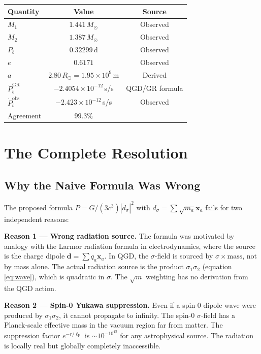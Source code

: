 \documentclass[12pt,a4paper]{article}
\newcommand{\lP}{\ell_{\mathrm{P}}}
\newcommand{\Msun}{M_{\odot}}
\begin{document}
\begin{center}
\renewcommand{\arraystretch}{1.15}
\begin{tabular}{lcc}
\toprule
Quantity & Value & Source\\
\midrule
$M_1$ & $1.441\,\Msun$ & Observed\\
$M_2$ & $1.387\,\Msun$ & Observed\\
$P_b$ & $0.32299\,\mathrm{d}$ & Observed\\
$e$ & $0.6171$ & Observed\\
$a$ & $2.80\,R_\odot = 1.95\times10^9\,\mathrm{m}$ & Derived\\
$\dot{P}_b^{\mathrm{GR}}$ & $-2.4054\times10^{-12}$\,s/s & QGD/GR formula\\
$\dot{P}_b^{\mathrm{obs}}$ & $-2.423\times10^{-12}$\,s/s & Observed\\
Agreement & $99.3\%$ & \\
\bottomrule
\end{tabular}
\end{center}

\section{The Complete Resolution}

\subsection{Why the Naive Formula Was Wrong}

The proposed formula $P = G/(3c^3)|\ddot{d}_\sigma|^2$ with
$d_\sigma = \sum\sqrt{m_a}\mathbf{x}_a$ fails for two independent reasons:

\medskip\noindent
\textbf{Reason 1 --- Wrong radiation source.}
The formula was motivated by analogy with the Larmor radiation formula
in electrodynamics, where the source is the charge dipole
$\mathbf{d} = \sum q_a \mathbf{x}_a$.
In QGD, the $\sigma$-field is sourced by $\sigma\times\text{mass}$,
not by mass alone. The actual radiation source is the product
$\sigma_1\sigma_2$ (equation \eqref{eq:wave}), which is quadratic in $\sigma$.
The $\sqrt{m}$ weighting has no derivation from the QGD action.

\medskip\noindent
\textbf{Reason 2 --- Spin-0 Yukawa suppression.}
Even if a spin-0 dipole wave were produced by $\sigma_1\sigma_2$,
it cannot propagate to infinity. The spin-0 $\sigma$-field has a
Planck-scale effective mass in the vacuum region far from matter.
The suppression factor $e^{-r/\lP}$ is $\sim 10^{-10^{43}}$ for
any astrophysical source. The radiation is locally real but globally
completely inaccessible.
\end{document}
